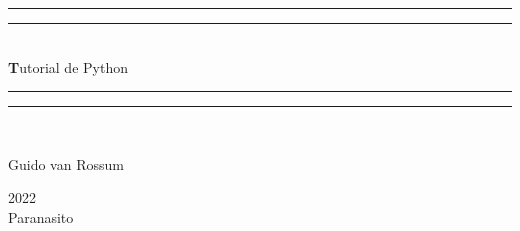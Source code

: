 \newlength{\drop}
\begin{titlepage}
  \textheight
  \centering

  \rule{\textwidth}{1.6pt}\vspace*{-\baselineskip}\vspace*{2pt}
  \rule{\textwidth}{0.4pt}\\[\baselineskip]
  \Huge{\textbf Tutorial de Python}\\
  \vspace{-1mm}

  \rule{\textwidth}{0.4pt}\vspace*{-\baselineskip}\vspace{3.2pt}
  \rule{\textwidth}{1.6pt}\\%

  \vspace{5mm}
  \scshape

  \vspace{5mm}
         {\Large Guido van Rossum\par}

         \vspace{5mm}
                {\scshape 2022} \\
                {\large Paranasito}\par
\end{titlepage}
